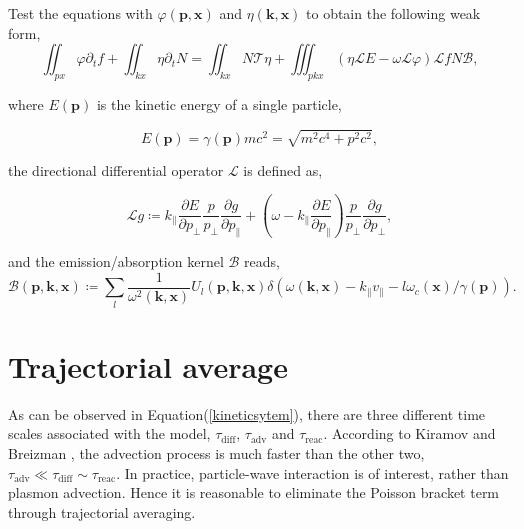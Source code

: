 \documentclass{article}
\numberwithin{equation}{section}
\begin{document}
Test the equations with $\varphi(\mathbf{p},\mathbf{x})$ and $\eta(\mathbf{k},\mathbf{x})$ to obtain the following weak form,
\begin{equation}
    \iint_{px}\varphi\partial_{t}f+\iint_{kx}\eta\partial_{t}N=\iint_{kx}N\mathcal{T}\eta+\iiint_{pkx}\left(\eta\mathcal{L}E-\omega\mathcal{L}\varphi\right)\mathcal{L}fN\mathcal{B},
\end{equation}

where $E(\mathbf{p})$ is the kinetic energy of a single particle,

\begin{equation*}
    E(\mathbf{p}) = \gamma(\mathbf{p})mc^2 = \sqrt{m^2c^4 + p^2c^2},
\end{equation*}

the directional differential operator $\mathcal{L}$ is defined as,

\begin{equation}\label{operatorL}
    \mathcal{L}g\coloneqq k_{\parallel}\frac{\partial E}{\partial p_{\perp}}\frac{p}{p_{\perp}}\frac{\partial g}{\partial p_{\parallel}}+\left(\omega-k_{\parallel}\frac{\partial E}{\partial p_{\parallel}}\right)\frac{p}{p_{\perp}}\frac{\partial g}{\partial p_{\perp}},
\end{equation}

and the emission/absorption kernel $\mathcal{B}$ reads,
\begin{equation}\label{kernel}
    \mathcal{B}(\mathbf{p},\mathbf{k},\mathbf{x})\coloneqq\sum_{l}\frac{1}{\omega^{2}(\mathbf{k},\mathbf{x})}U_{l}(\mathbf{p},\mathbf{k},\mathbf{x})\delta(\omega(\mathbf{k},\mathbf{x})-k_{\parallel}v_{\parallel}-l\omega_{c}(\mathbf{x})/\gamma(\mathbf{p})).
\end{equation}







\section{Trajectorial average}\label{sec:aver}
As can be observed in Equation(\ref{kineticsytem}), there are three different time scales associated with the model, $\tau_\text{diff}$, $\tau_\text{adv}$ and $\tau_\text{reac}$. According to Kiramov and Breizman \cite{kiramov2021reduced}, the advection process is much faster than the other two, $\tau_\text{adv} \ll \tau_\text{diff} \sim \tau_\text{reac}$. In practice, particle-wave interaction is of interest, rather than plasmon advection. Hence it is reasonable to eliminate the Poisson bracket term through trajectorial averaging. 
\end{document}
